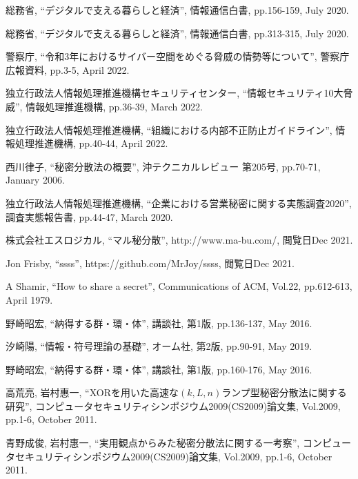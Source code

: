 \documentclass[twocolumn, fleqn, uplatex]{jsarticle}
\begin{document}
\begin{thebibliography}{9}
	\footnotesize
		総務省, 
		``デジタルで支える暮らしと経済'', 
		情報通信白書, pp.156-159, July 2020.

		総務省, 
		``デジタルで支える暮らしと経済'', 
		情報通信白書, pp.313-315, July 2020.
	
		警察庁, 
		``令和3年におけるサイバー空間をめぐる脅威の情勢等について'', 
		警察庁 広報資料, pp.3-5, April 2022.
	
		独立行政法人情報処理推進機構セキュリティセンター, 
		``情報セキュリティ10大脅威'', 
		情報処理推進機構, pp.36-39, March 2022.

		独立行政法人情報処理推進機構, 
		``組織における内部不正防止ガイドライン'', 
		情報処理推進機構, pp.40-44, April 2022.
	
		西川律子,
		``秘密分散法の概要'', 
		沖テクニカルレビュー 第205号, pp.70-71, January 2006.

		独立行政法人情報処理推進機構, 
		``企業における営業秘密に関する実態調査2020'', 
		調査実態報告書, pp.44-47, March 2020.
	
		株式会社エスロジカル, 
		``マル秘分散'', 
		http://www.ma-bu.com/, 
		閲覧日Dec 2021.
	
		Jon Frisby, 
		``ssss'', 
		https://github.com/MrJoy/ssss, 
		閲覧日Dec 2021.
	
		A Shamir, 
		``How to share a secret'', 
		Communications of ACM, Vol.22, pp.612-613, April 1979.
	
		野崎昭宏, 
		``納得する群・環・体'', 
		講談社, 第1版, pp.136-137, May 2016.
	
		汐崎陽, 
		``情報・符号理論の基礎'', 
		オーム社, 第2版, pp.90-91, May 2019.
	
		野崎昭宏, 
		``納得する群・環・体'', 
		講談社, 第1版, pp.160-176, May 2016.

		高荒亮, 岩村惠一, 
		``XORを用いた高速な$(k,L,n)$ランプ型秘密分散法に関する研究'', 
		コンピュータセキュリティシンポジウム2009(CS2009)論文集, Vol.2009, pp.1-6, October 2011.
	
		青野成俊, 岩村惠一, 
		``実用観点からみた秘密分散法に関する一考察'', 
		コンピュータセキュリティシンポジウム2009(CS2009)論文集, Vol.2009, pp.1-6, October 2011.

\end{thebibliography}
\end{document}
